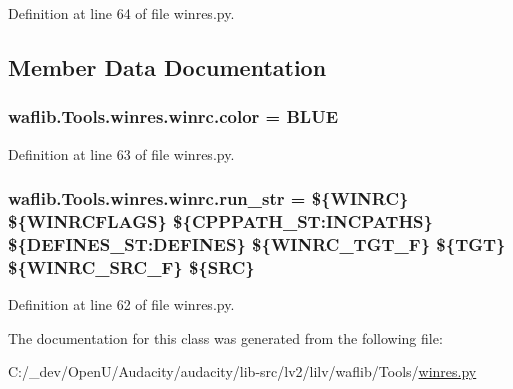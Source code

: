 Definition at line 64 of file winres.\+py.



\subsection{Member Data Documentation}
\subsubsection[{\texorpdfstring{color}{color}}]{ waflib.\+Tools.\+winres.\+winrc.\+color = \textquotesingle{}B\+L\+UE\textquotesingle{}\hspace{0.3cm}{\ttfamily [static]}}\hypertarget{classwaflib_1_1_tools_1_1winres_1_1winrc_aa2be34c268533a158e36bbb58854d232}{}\label{classwaflib_1_1_tools_1_1winres_1_1winrc_aa2be34c268533a158e36bbb58854d232}


Definition at line 63 of file winres.\+py.

\subsubsection[{\texorpdfstring{run\+\_\+str}{run_str}}]{ waflib.\+Tools.\+winres.\+winrc.\+run\+\_\+str = \textquotesingle{}\$\{W\+I\+N\+RC\} \$\{W\+I\+N\+R\+C\+F\+L\+A\+GS\} \$\{C\+P\+P\+P\+A\+T\+H\+\_\+\+S\+T\+:\+I\+N\+C\+P\+A\+T\+HS\} \$\{D\+E\+F\+I\+N\+E\+S\+\_\+\+S\+T\+:\+D\+E\+F\+I\+N\+ES\} \$\{W\+I\+N\+R\+C\+\_\+\+T\+G\+T\+\_\+F\} \$\{T\+GT\} \$\{W\+I\+N\+R\+C\+\_\+\+S\+R\+C\+\_\+F\} \$\{S\+RC\}\textquotesingle{}\hspace{0.3cm}{\ttfamily [static]}}\hypertarget{classwaflib_1_1_tools_1_1winres_1_1winrc_ac045ab43f4739dbf7baa0530c84e6572}{}\label{classwaflib_1_1_tools_1_1winres_1_1winrc_ac045ab43f4739dbf7baa0530c84e6572}


Definition at line 62 of file winres.\+py.



The documentation for this class was generated from the following file\+:\begin{DoxyCompactItemize}
\item 
C\+:/\+\_\+dev/\+Open\+U/\+Audacity/audacity/lib-\/src/lv2/lilv/waflib/\+Tools/\hyperlink{lilv_2waflib_2_tools_2winres_8py}{winres.\+py}\end{DoxyCompactItemize}
